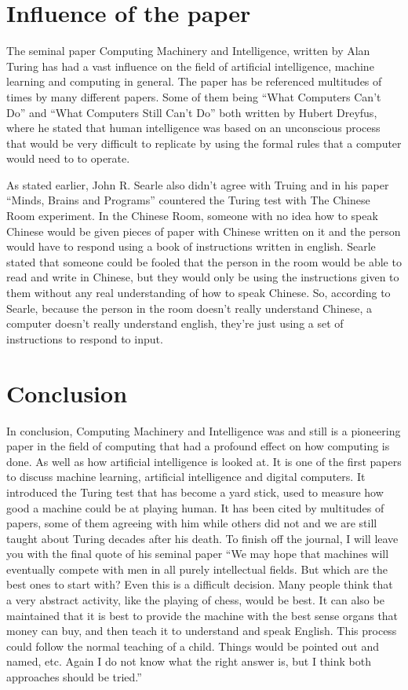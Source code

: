 \documentclass{article}
\begin{document}
\section{Influence of the paper}

The seminal paper Computing Machinery and Intelligence, written by Alan Turing has had a vast influence on the field of 
artificial intelligence, machine learning and computing in general. The paper has be referenced multitudes of times by many 
different papers. Some of them being “What Computers Can't Do” and “What Computers Still Can't Do”  both written by Hubert 
Dreyfus, where he stated that human intelligence was based on an unconscious process that would be very difficult to replicate 
by using the formal rules that a computer would need to to operate. 

As stated earlier, John R. Searle also didn’t agree with Truing and in his paper “Minds, Brains and Programs” countered the 
Turing test with The Chinese Room experiment. In the Chinese Room, someone with no idea how to speak Chinese would be given 
pieces of paper with Chinese written on it and the person would have to respond using a book of instructions written in 
english. Searle stated that someone could be fooled that the person in the room would be able to read and write in Chinese, 
but they would only be using the instructions given to them without any real understanding of how to speak Chinese. So, 
according to Searle, because the person in the room doesn’t really understand Chinese, a computer doesn’t really understand 
english, they’re just using a set of instructions to respond to input.

\section{Conclusion}

In conclusion, Computing Machinery and Intelligence was and still is a pioneering paper in the field of computing that had a 
profound effect on how computing is done. As well as how artificial intelligence is looked at. It is one of the first papers 
to discuss machine learning, artificial intelligence and digital computers. It introduced the Turing test that has become a 
yard stick, used to measure  how good a machine could be at playing human. It has been cited by multitudes of papers, some of 
them agreeing with him while others did not and we are still taught about Turing decades after his death. To finish off the 
journal, I will leave you with the final quote of his seminal paper “We may hope that machines will eventually compete with 
men in all purely intellectual fields. But which are the best ones to start with? Even this is a difficult decision. Many 
people think that a very abstract activity, like the playing of chess, would be best. It can also be maintained that it is 
best to provide the machine with the best sense organs that money can buy, and then teach it to understand and speak English. 
This process could follow the normal teaching of a child. Things would be pointed out and named, etc. Again I do not know what 
the right answer is, but I think both approaches should be tried.”
\end{document}
